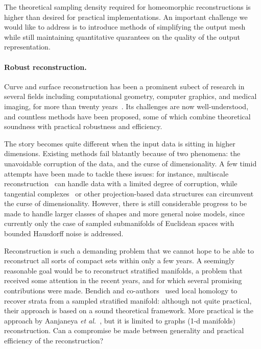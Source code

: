 The theoretical sampling density required for homeomorphic
reconstructions is higher than desired for practical
implementations. An important challenge we would like to address is to
introduce methods of simplifying the output mesh while still
maintaining quantitative quarantees on the quality of the output
representation. 


\paragraph{Robust reconstruction.}

Curve and surface reconstruction has been a prominent subect of
research in several fields including computational geometry, computer
graphics, and medical imaging, for more than twenty
years~\cite{dey-csr-2007}. Its challenges are now well-understood, and
countless methods have been proposed, some of which combine
theoretical soundness with practical robustness and efficiency.

The story becomes quite different when the input data is sitting in
higher dimensions. Existing methods fail blatantly because of two
phenomena: the unavoidable corruption of the data, and the curse of
dimensionality. A few timid attempts have been made to tackle these
issues: for instance, multiscale
reconstruction~\cite{geometrica-bgo-09} can handle data with a limited
degree of corruption, while tangential
complexes~\cite{geometrica-7142i} or other projection-based data
structures can circumvent the curse of dimensionality. However, there
is still considerable progress to be made to handle larger classes of
shapes and more general noise models, since currently only the case of
sampled submanifolds of Euclidean spaces with bounded Hausdorff noise
is addressed.

Reconstruction is such a demanding problem that we cannot hope to be
able to reconstruct all sorts of compact sets within only a few
years. A seemingly reasonable goal would be to reconstruct stratified
manifolds, a problem that received some attention in the recent years,
and for which several promising contributions were made.  Bendich and
co-authors~\cite{bendich-PhD,bendich-strat1,bendich-strat2} used
local homology to recover strata from a sampled stratified manifold:
although not quite practical, their approach is based on a sound
theoretical framework. More practical is the approach by Aanjaneya
{\em et al.}~\cite{metric-graphs-reconstruction}, but it is limited to
graphs (1-d manifolds) reconstruction. Can a compromise be made
between generality and practical efficiency of the reconstruction?

